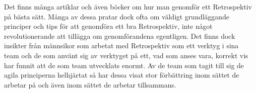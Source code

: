 Det finns många artiklar och även böcker om hur man genomför ett Retrospektiv på bästa sätt. Många av dessa pratar dock ofta om väldigt grundläggande principer och tips för att genomföra ett bra Retrospektiv, inte något revolutionerande att tillägga om genomförandena egentligen.
Det finns dock insikter från männsikor som arbetat med Retrospektiv som ett verktyg i sina team och de som använt sig av verktyget på ett, vad som anses vara, korrekt vis har funnit att de som team utvecklats enormt.\cite{wow_team} Av de team som tagit till sig de agila principerna helhjärtat så har dessa visat stor förbättring inom sättet de arbetar på och även inom sättet de arbetar tillsammans.\cite{wow_team} 






